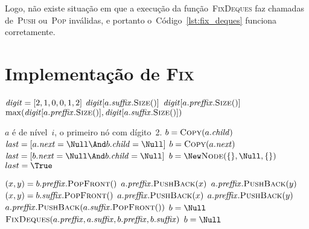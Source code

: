 \documentclass[main.tex]{subfiles}
\begin{document}
Logo, não existe situação em que a execução da função~\textsc{FixDeques} faz chamadas de~\textsc{Push} ou~\textsc{Pop} inválidas, e portanto o~Código~\ref{lst:fix_deques} funciona corretamente.

\section{Implementação de {\normalfont \textsc{Fix}}}

\begin{algorithm}
\begin{algorithmic}[1]

    \State $\mathit{digit} = [2, 1, 0, 0, 1, 2]$ 
        \State \Return $\V{digit}[a.\V{suffix}.\Call{Size}{\null}]$
        \State \Return $\V{digit}[a.\V{preffix}.\Call{Size}{\null}]$
    \Else
        \State \Return $\max(\V{digit}[a.\V{preffix}.\Call{Size}{\null}], \V{digit}[a.\V{suffix}.\Call{Size}{\null}])$
    \EndIf
\EndFunction

\Require $a$ é de nível~$i$, o primeiro nó com dígito~2.
     \label{line:fix:p1b}
        \State $b = \Call{Copy}{a.\V{child}}$
        \State $\V{last} = [a.\V{next} = \Null \And b.\V{child} = \Null]$
        \State $b = \Call{Copy}{a.\V{next}}$
        \State $\V{last} = [b.\V{next} = \Null \And b.\V{child} = \Null]$
    \Else
        \State $b = \New \Call{Node}{\{\}, \Null, \{\}}$  \label{line:fix:p1e}
        \State $last = \True$
    \EndIf
    
       \label{line:fix:p2b}
            \State $(x, y) = b.\V{preffix}.\Call{PopFront}{\null}$
            \State $a.\mathit{preffix}.\textsc{PushBack}(x)$
            \State $a.\mathit{preffix}.\textsc{PushBack}(y)$
        \EndIf
            \State $(x, y) = b.\V{suffix}.\Call{PopFront}{\null}$
            \State $a.\mathit{preffix}.\textsc{PushBack}(x)$
            \State $a.\mathit{preffix}.\textsc{PushBack}(y)$
        \EndIf
            \State $a.\V{preffix}.\textsc{PushBack}(a.\V{suffix}.\Call{PopFront}{\null})$
        \EndIf
        \State $b = \Null$  \label{line:fix:p2e}
    \Else {}  \label{line:fix:p3b}
        \State $\Call{FixDeques}{a.\V{preffix}, a.\V{suffix}, b.\V{preffix}, b.\V{suffix}}$
         \label{line:fix:if_empty}
            \State $b = \Null$  \label{line:fix:p3e}
        \EndIf
    \EndIf
    

\end{algorithmic}
\end{algorithm}
\end{document}
